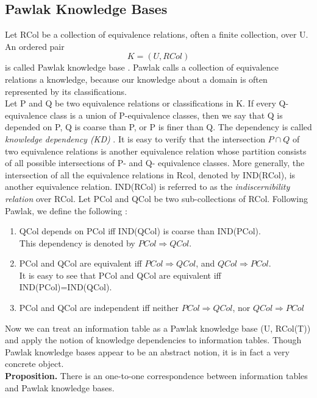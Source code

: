 \documentclass[12pt]{article}
\begin{document}
\subsection{Pawlak Knowledge Bases}
Let RCol be a collection of equivalence relations, often a finite collection, over U.  An ordered pair
\[K = (U,RCol)\]
is called Pawlak knowledge base \cite{Pawlak91}. Pawlak calls a collection of equivalence relations a knowledge, because our knowledge about a domain is often represented by its classifications.\\ 
Let P and Q be two equivalence relations or classifications in K. If every Q-equivalence class is a union of P-equivalence classes, then we say that Q is depended on P, Q is coarse than P, or  P is finer than Q. The dependency is called \emph{knowledge dependency (KD)} \cite{Pawlak91}. It is easy to verify that the intersection $P \cap Q$ of two equivalence relations is another equivalence relation whose partition consists of all possible intersections of P- and Q-   equivalence classes. More generally, the intersection of all the equivalence relations in Rcol, denoted by IND(RCol), is another equivalence relation. IND(RCol) is referred to as the \emph{indiscernibility relation} over RCol. Let PCol and QCol be two sub-collections of RCol. Following Pawlak, we define the following \cite{Pawlak91}:
\begin{enumerate}
\item QCol depends on PCol iff IND(QCol) is coarse than IND(PCol).\\
This dependency is denoted by  $PCol \Rightarrow QCol$.
\item PCol and QCol are equivalent iff $PCol \Rightarrow QCol$, and $QCol \Rightarrow PCol$.\\
It is easy to see that PCol and QCol are equivalent iff IND(PCol)=IND(QCol).
\item PCol and QCol are independent iff neither $PCol \Rightarrow QCol$, nor $QCol \Rightarrow PCol$ 
\end{enumerate}
Now we can treat an information table as a Pawlak knowledge base (U, RCol(T)) and apply the notion of knowledge dependencies to information tables. Though Pawlak knowledge bases appear to be an abstract notion, it is in fact a very concrete object.\\

\textbf{Proposition.} There is an one-to-one correspondence between information tables and Pawlak knowledge bases.
\end{document}
